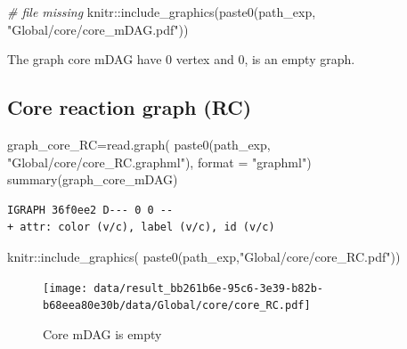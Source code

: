 \documentclass[
  letterpaper,
  DIV=11,
  numbers=noendperiod]{scrreprt}
\newenvironment{Shaded}{}{}
\newcommand{\AttributeTok}[1]{\textcolor[rgb]{0.78,0.47,0.87}{#1}}
\newcommand{\CommentTok}[1]{\textcolor[rgb]{0.36,0.39,0.44}{\textit{#1}}}
\newcommand{\FunctionTok}[1]{\textcolor[rgb]{0.38,0.69,0.94}{#1}}
\newcommand{\NormalTok}[1]{\textcolor[rgb]{0.67,0.70,0.75}{#1}}
\newcommand{\OtherTok}[1]{\textcolor[rgb]{0.15,0.68,0.38}{#1}}
\newcommand{\SpecialCharTok}[1]{\textcolor[rgb]{0.34,0.71,0.76}{#1}}
\newcommand{\StringTok}[1]{\textcolor[rgb]{0.60,0.76,0.47}{#1}}
\begin{document}
\begin{Shaded}
\begin{Highlighting}[]
\CommentTok{\# file missing}
\NormalTok{knitr}\SpecialCharTok{::}\FunctionTok{include\_graphics}\NormalTok{(}\FunctionTok{paste0}\NormalTok{(path\_exp,}
                               \StringTok{"Global/core/core\_mDAG.pdf"}\NormalTok{))}
\end{Highlighting}
\end{Shaded}

The graph core mDAG have 0 vertex and 0, is an empty graph.

\hypertarget{core-reaction-graph-rc}{%
\subsection{Core reaction graph (RC)}\label{core-reaction-graph-rc}}

\begin{Shaded}
\begin{Highlighting}[]
\NormalTok{graph\_core\_RC}\OtherTok{=}\FunctionTok{read.graph}\NormalTok{(}
  \FunctionTok{paste0}\NormalTok{(path\_exp,}
         \StringTok{"Global/core/core\_RC.graphml"}\NormalTok{),}
  \AttributeTok{format =} \StringTok{"graphml"}\NormalTok{)}
\FunctionTok{summary}\NormalTok{(graph\_core\_mDAG)}
\end{Highlighting}
\end{Shaded}

\begin{verbatim}
IGRAPH 36f0ee2 D--- 0 0 -- 
+ attr: color (v/c), label (v/c), id (v/c)
\end{verbatim}

\begin{Shaded}
\begin{Highlighting}[]
\NormalTok{knitr}\SpecialCharTok{::}\FunctionTok{include\_graphics}\NormalTok{(}
  \FunctionTok{paste0}\NormalTok{(path\_exp,}\StringTok{"Global/core/core\_RC.pdf"}\NormalTok{))}
\end{Highlighting}
\end{Shaded}

\begin{figure}[H]

{\centering \texttt{[image: data/result\_bb261b6e-95c6-3e39-b82b-b68eea80e30b/data/Global/core/core\_RC.pdf]}

}

\caption{Core mDAG is empty}

\end{figure}
\end{document}
